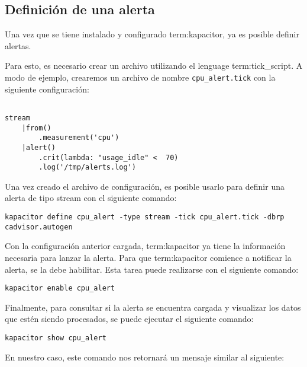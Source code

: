 \subsection{Definición de una alerta}
\label{definir-alerta}

Una vez que se tiene instalado y configurado \gls{term:kapacitor}, ya es
posible definir alertas.

Para esto, es necesario crear un archivo utilizando el lenguage
\gls{term:tick_script}. A modo de ejemplo, crearemos un archivo de nombre
\texttt{cpu\_alert.tick} con la siguiente configuración:

\begin{lstlisting}

stream
    |from()
        .measurement('cpu')
    |alert()
        .crit(lambda: "usage_idle" <  70)
        .log('/tmp/alerts.log')

\end{lstlisting}

Una vez creado el archivo de configuración, es posible usarlo para definir una
alerta de tipo stream con el siguiente comando:

\begin{lstlisting}
kapacitor define cpu_alert -type stream -tick cpu_alert.tick -dbrp cadvisor.autogen
\end{lstlisting}

Con la configuración anterior cargada, \gls{term:kapacitor} ya tiene la
información necesaria para lanzar la alerta. Para que \gls{term:kapacitor}
comience a notificar la alerta, se la debe habilitar. Esta tarea puede
realizarse con el siguiente comando:

\begin{lstlisting}
kapacitor enable cpu_alert
\end{lstlisting}

Finalmente, para consultar si la alerta se encuentra cargada y visualizar los
datos que estén siendo procesados, se puede ejecutar el siguiente comando:

\begin{lstlisting}
kapacitor show cpu_alert
\end{lstlisting}

En nuestro caso, este comando nos retornará un mensaje similar al siguiente:

